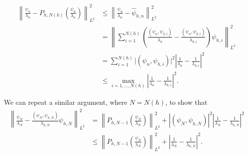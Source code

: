 \documentclass[12pt]{amsart}
\begin{document}
\begin{align*}
    \left\lVert \frac{\psi_n}{\lambda_n} - P_{h, N(h)}\left( \frac{\psi_n}{\lambda_n} \right) \right\rVert_{L^2}^2
    & \leq \left\lVert \frac{\psi_n}{\lambda_n} - \hat \psi_{h, n} \right\rVert_{L^2}^2 \\
    & = \left\lVert \sum_{i=1}^{N(h)} \left( \frac{(\psi_n, \psi_{h, i})}{\lambda_n} - \frac{(\psi_n, \psi_{h, i})}{\lambda_{h, i}} \right) \psi_{h, i} \right\rVert_{L^2}^2 \\
    & = \sum_{i=1}^{N(h)} \lvert (\psi_n, \psi_{h, i}) \rvert^2 \left\lvert \frac{1}{\lambda_n} - \frac{1}{\lambda_{h, i}} \right\rvert^2 \\
    & \leq \max_{i=1, \dots, N(h)} \left\lvert \frac{1}{\lambda_n} - \frac{1}{\lambda_{h, i}} \right\rvert^2.
\end{align*}



We can repeat a similar argument, where \(N = N(h)\), to show that
\begin{align*}
    \left\lVert \frac{\psi_N}{\lambda_N} - \frac{(\psi_N, \psi_{h, N})}{\lambda_{h, N}} \psi_{h, N} \right\rVert_{L^2}^2
    & = \left\lVert P_{h, N-1}\left( \frac{\psi_N}{\lambda_N} \right)\right\rVert_{L^2}^2
    +  \left\lvert (\psi_N, \psi_{h, N}) \right\rvert^2 \left\lvert \frac{1}{\lambda_N} - \frac{1}{\lambda_{h, N}} \right\rvert^2 \\
    & \leq \left\lVert P_{h, N-1}\left( \frac{\psi_N}{\lambda_N} \right)\right\rVert_{L^2}^2
    +  \left\lvert \frac{1}{\lambda_N} - \frac{1}{\lambda_{h, N}} \right\rvert^2.
\end{align*}
\end{document}
